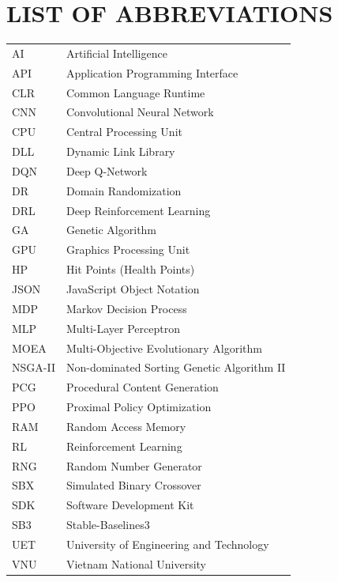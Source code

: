 \chapter*{LIST OF ABBREVIATIONS}

\begin{tabular}{ll}
AI     & Artificial Intelligence \\
API    & Application Programming Interface \\
CLR    & Common Language Runtime \\
CNN    & Convolutional Neural Network \\
CPU    & Central Processing Unit \\
DLL    & Dynamic Link Library \\
DQN    & Deep Q-Network \\
DR     & Domain Randomization \\
DRL    & Deep Reinforcement Learning \\
GA     & Genetic Algorithm \\
GPU    & Graphics Processing Unit \\
HP     & Hit Points (Health Points) \\
JSON   & JavaScript Object Notation \\
MDP    & Markov Decision Process \\
MLP    & Multi-Layer Perceptron \\
MOEA   & Multi-Objective Evolutionary Algorithm \\
NSGA-II& Non-dominated Sorting Genetic Algorithm II \\
PCG    & Procedural Content Generation \\
PPO    & Proximal Policy Optimization \\
RAM    & Random Access Memory \\
RL     & Reinforcement Learning \\
RNG    & Random Number Generator \\
SBX    & Simulated Binary Crossover \\
SDK    & Software Development Kit \\
SB3    & Stable-Baselines3 \\
UET    & University of Engineering and Technology \\
VNU    & Vietnam National University \\
\end{tabular}
